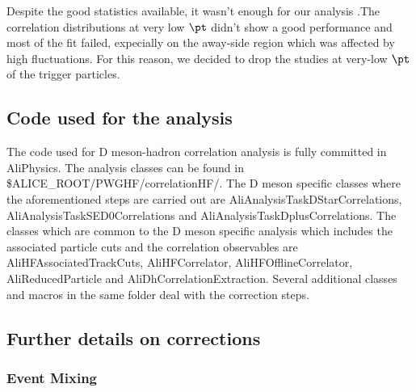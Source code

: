 Despite the good statistics available, it wasn't enough for our analysis .The correlation distributions at very low $\pt$ didn't show a good performance and most of the fit failed, expecially on the away-side region which was affected by high fluctuations. For this reason, we decided to drop the studies at very-low $\pt$ of the trigger particles.



\subsection{Code used for the analysis}
The code used for D meson-hadron correlation analysis is fully committed in AliPhysics. The analysis classes can be found in
\$ALICE\_ROOT/PWGHF/correlationHF/.  The  D meson specific classes where the aforementioned steps are carried out are
AliAnalysisTaskDStarCorrelations, AliAnalysisTaskSED0Correlations and AliAnalysisTaskDplusCorrelations. The classes which are common to the D meson specific analysis which includes the associated particle cuts and the correlation observables are AliHFAssociatedTrackCuts, AliHFCorrelator, AliHFOfflineCorrelator, AliReducedParticle and AliDhCorrelationExtraction. Several additional classes and macros in the same folder deal with the correction steps.


\subsection{Further details on corrections}
\subsubsection{Event Mixing}


